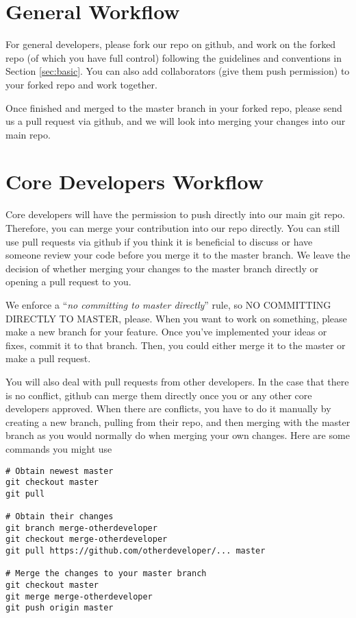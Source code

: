 \documentclass[runningheads,letterpaper]{llncs}
\begin{document}
\section{General Workflow}

For general developers, please fork our repo on github, and work on the forked repo (of which you have full control) following the guidelines and conventions in Section \ref{sec:basic}.
You can also add collaborators (give them push permission) to your forked repo and work together.

Once finished and merged to the master branch in your forked repo, please send us a pull request via github, and we will look into merging your changes into our main repo.

\section{Core Developers Workflow}

Core developers will have the permission to push directly into our main git repo.
Therefore, you can merge your contribution into our repo directly.
You can still use pull requests via github if you think it is beneficial to discuss or have someone review your code before you merge it to the master branch.
We leave the decision of whether merging your changes to the master branch directly or opening a pull request to you.

We enforce a ``{\it no committing to master directly}'' rule, so NO COMMITTING DIRECTLY TO MASTER, please.
When you want to work on something, please make a new branch for your feature.
Once you've implemented your ideas or fixes, commit it to that branch.
Then, you could either merge it to the master or make a pull request.

You will also deal with pull requests from other developers.
In the case that there is no conflict, github can merge them directly once you or any other core developers approved.
When there are conflicts, you have to do it manually by creating a new branch, pulling from their repo, and then merging with the master branch as you would normally do when merging your own changes.
Here are some commands you might use
\begin{verbatim}
# Obtain newest master
git checkout master
git pull

# Obtain their changes
git branch merge-otherdeveloper
git checkout merge-otherdeveloper
git pull https://github.com/otherdeveloper/... master

# Merge the changes to your master branch
git checkout master
git merge merge-otherdeveloper
git push origin master
\end{verbatim}
\end{document}
